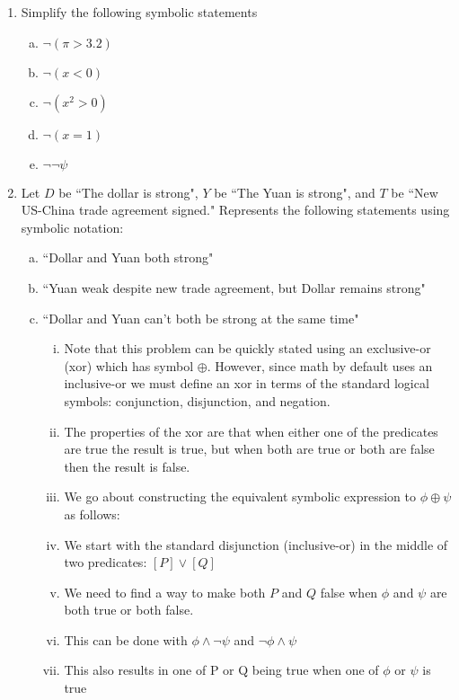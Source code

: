 \documentclass[]{article}
\begin{document}
\begin{enumerate}
  \item Simplify the following symbolic statements
  \begin {enumerate}[(a)]
  	\item $\neg(\pi > 3.2)$ 
  	\item $\neg(x < 0)$ 
  	\item $\neg(x^2 > 0)$ 
  	\item $\neg(x = 1)$ 
  	\item $\neg\neg\psi$ \answerbox{$\psi$}
  \end {enumerate}
  \setcounter{enumi}{10}
  \item Let $D$ be ``The dollar is strong", $Y$ be ``The Yuan is strong", and $T$ be ``New US-China trade agreement signed." Represents the following statements using symbolic notation:
  \begin{enumerate}[(a)]
  	\item ``Dollar and Yuan both strong" 
  	\item ``Yuan weak despite new trade agreement, but Dollar remains strong" 
  	\item ``Dollar and Yuan can't both be strong at the same time"\\
  	\begin{enumerate}[(i)]
  		\item Note that this problem can be quickly stated using an exclusive-or (xor) which has symbol $\oplus$. However, since math by default uses an inclusive-or we must define an xor in terms of the standard logical symbols: conjunction, disjunction, and negation.
  		\item The properties of the xor are that when either one of the predicates are true the result is true, but when both are true or both are false then the result is false.
  		\item We go about constructing the equivalent symbolic expression to $\phi \oplus \psi$ as follows:
  		\item We start with the standard disjunction (inclusive-or) in the middle of two predicates: $[P] \vee [Q]$
  		\item We need to find a way to make both $P$ and $Q$ false when $\phi$ and $\psi$ are both true or both false.
  		\item This can be done with $\phi \wedge \neg\psi$ and $\neg\phi \wedge \psi$
  		\item This also results in one of P or Q being true when one of $\phi$ or $\psi$ is true

\end{enumerate}
\end{enumerate}
\end{enumerate}
\end{document}
